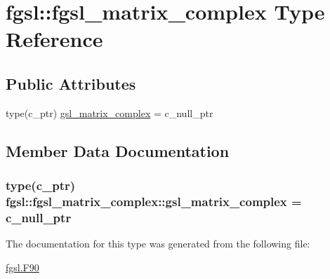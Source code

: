\hypertarget{structfgsl_1_1fgsl__matrix__complex}{}\section{fgsl\+:\+:fgsl\+\_\+matrix\+\_\+complex Type Reference}
\label{structfgsl_1_1fgsl__matrix__complex}
\subsection*{Public Attributes}
\begin{DoxyCompactItemize}
\item 
type(c\+\_\+ptr) \hyperlink{structfgsl_1_1fgsl__matrix__complex_a81cb20350441aba8adeb1e51dbb1e53c}{gsl\+\_\+matrix\+\_\+complex} = c\+\_\+null\+\_\+ptr
\end{DoxyCompactItemize}


\subsection{Member Data Documentation}
\hypertarget{structfgsl_1_1fgsl__matrix__complex_a81cb20350441aba8adeb1e51dbb1e53c}{}
\subsubsection[{gsl\+\_\+matrix\+\_\+complex}]{\setlength{\rightskip}{0pt plus 5cm}type(c\+\_\+ptr) fgsl\+::fgsl\+\_\+matrix\+\_\+complex\+::gsl\+\_\+matrix\+\_\+complex = c\+\_\+null\+\_\+ptr}\label{structfgsl_1_1fgsl__matrix__complex_a81cb20350441aba8adeb1e51dbb1e53c}


The documentation for this type was generated from the following file\+:\begin{DoxyCompactItemize}
\item 
\hyperlink{fgsl_8F90}{fgsl.\+F90}\end{DoxyCompactItemize}
